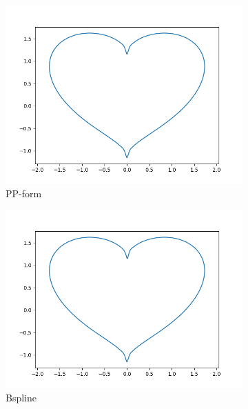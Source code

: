 \documentclass[a4paper]{article}
\begin{document}
\begin{figure}[H]
    \centering
    \begin{subfigure}[b]{0.45\textwidth}
        \centering
        \includegraphics[width=\textwidth]{../figure/E_heart_cum_PP160.png}
        \caption{PP-form}
    \end{subfigure}
    \begin{subfigure}[b]{0.45\textwidth}
        \centering
        \includegraphics[width=\textwidth]{../figure/E_heart_cum_B160.png}
        \caption{Bspline}
    \end{subfigure}
    \\
    \begin{subfigure}[b]{0.45\textwidth}
        \centering

\end{subfigure}
\end{figure}
\end{document}
